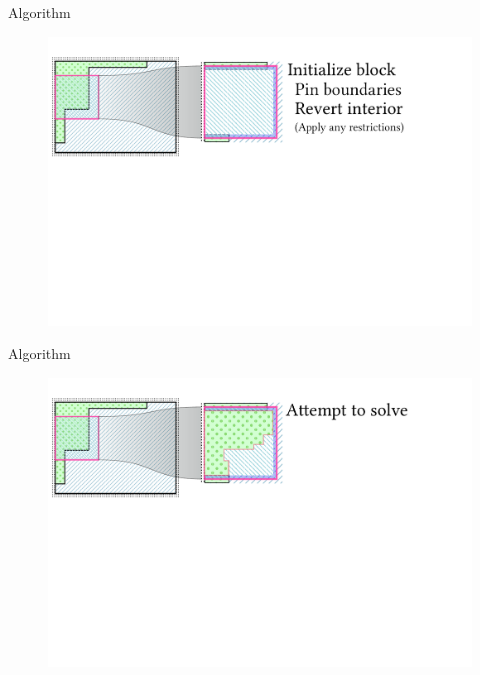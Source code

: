 \documentclass{beamer}
\begin{document}
  \begin{frame}[fragile]{Algorithm}
    \begin{figure}
      \includegraphics[width=\textwidth]{figs/poms_alg2.pdf}
    \end{figure}
  \end{frame}

  \begin{frame}[fragile]{Algorithm}
    \begin{figure}
      \includegraphics[width=\textwidth]{figs/poms_alg3.pdf}
    \end{figure}
  \end{frame}
\end{document}
